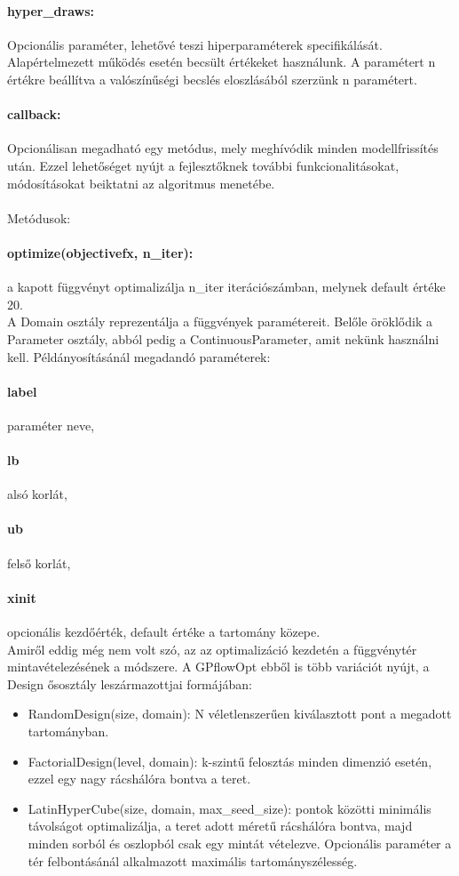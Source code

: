 \paragraph{hyper\_draws:} Opcionális paraméter, lehetővé teszi hiperparaméterek specifikálását. Alapértelmezett működés esetén becsült értékeket használunk. A paramétert n értékre beállítva a valószínűségi becslés eloszlásából %
szerzünk n paramétert.
\paragraph{callback:} Opcionálisan megadható egy metódus, mely meghívódik minden modellfrissítés után. Ezzel lehetőséget nyújt a fejlesztőknek további funkcionalitásokat, módosításokat beiktatni az algoritmus menetébe.\\\\
Metódusok:
\paragraph{optimize(objectivefx, n\_iter):} a kapott függvényt optimalizálja n\_iter iterációszámban, melynek default értéke 20.\\

A Domain osztály reprezentálja a függvények paramétereit. Belőle öröklődik a Parameter osztály, abból pedig a ContinuousParameter, amit nekünk használni kell. Példányosításánál megadandó paraméterek:
\paragraph{label} paraméter neve,
\paragraph{lb} alsó korlát,
\paragraph{ub} felső korlát,
\paragraph{xinit} opcionális kezdőérték, default értéke a tartomány közepe.\\

Amiről eddig még nem volt szó, az az optimalizáció kezdetén a függvénytér mintavételezésének a módszere. A GPflowOpt ebből is több variációt nyújt, a Design ősosztály leszármazottjai formájában: 
\begin{itemize}
	\item RandomDesign(size, domain): N véletlenszerűen kiválasztott pont a megadott tartományban.
	\item FactorialDesign(level, domain): k-szintű felosztás minden dimenzió esetén, ezzel egy nagy rácshálóra bontva a teret.
	\item LatinHyperCube(size, domain, max\_seed\_size): pontok közötti minimális távolságot optimalizálja, a teret adott méretű rácshálóra bontva, majd minden sorból és oszlopból csak egy mintát vételezve. Opcionális paraméter a tér felbontásánál alkalmazott maximális tartományszélesség.
\end{itemize}

